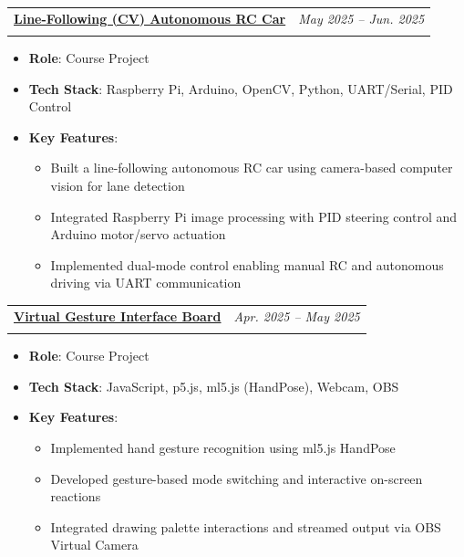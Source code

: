 \documentclass[a4paper,11pt]{article}
\makeatletter
\newcommand{\resumeProject}[4]{%
\item
    \begin{tabular*}{0.98\textwidth}[t]{l@{\extracolsep{\fill}}r}
        \textbf{#1} & \textit{\footnotesize{#3}} \\
        \footnotesize{\textit{#2}} & \footnotesize{#4}
    \end{tabular*}
}
\newcommand{\resumeItemListStart}{\begin{itemize}}
\newcommand{\resumeItemListEnd}{\end{itemize}}
\makeatother
\begin{document}
\vspace{0.5em}

\resumeProject
{\href{https://github.com/EliseEgkart/ECS_Autonomous_driving_based_on_computer_vision}{Line-Following (CV) Autonomous RC Car}}
{}
{May 2025 -- Jun. 2025}
{}
\vspace{-1.5em}
\resumeItemListStart
  \item \textbf{Role}: Course Project
  \item \textbf{Tech Stack}: Raspberry Pi, Arduino, OpenCV, Python, UART/Serial, PID Control
  \item \textbf{Key Features}:
  \begin{itemize}[leftmargin=1.2em]
    \item Built a line-following autonomous RC car using camera-based computer vision for lane detection
    \item Integrated Raspberry Pi image processing with PID steering control and Arduino motor/servo actuation
    \item Implemented dual-mode control enabling manual RC and autonomous driving via UART communication
  \end{itemize}
\resumeItemListEnd

\vspace{0.5em}

\resumeProject
{\href{https://github.com/EliseEgkart/ECS_Interactive_Reactions}{Virtual Gesture Interface Board}}
{}
{Apr. 2025 -- May 2025}
{}
\vspace{-1.5em}
\resumeItemListStart
  \item \textbf{Role}: Course Project
  \item \textbf{Tech Stack}: JavaScript, p5.js, ml5.js (HandPose), Webcam, OBS
  \item \textbf{Key Features}:
  \begin{itemize}[leftmargin=1.2em]
    \item Implemented hand gesture recognition using ml5.js HandPose
    \item Developed gesture-based mode switching and interactive on-screen reactions
    \item Integrated drawing palette interactions and streamed output via OBS Virtual Camera
  \end{itemize}
\resumeItemListEnd
\end{document}
